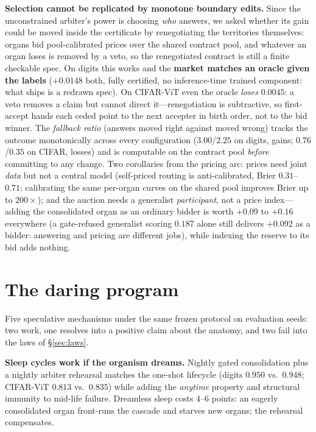 \documentclass{article}
\begin{document}
\textbf{Selection cannot be replicated by monotone boundary edits.} Since the
unconstrained arbiter's power is choosing \emph{who} answers, we asked whether
its gain could be moved inside the certificate by renegotiating the
territories themselves: organs bid pool-calibrated prices over the shared
contract pool, and whatever an organ loses is removed by a veto, so the
renegotiated contract is still a finite checkable spec. On digits this works
and the \textbf{market matches an oracle given the labels} ($+0.0148$ both,
fully certified, no inference-time trained component: what ships is a redrawn
spec). On CIFAR-ViT even the oracle \emph{loses} $0.0045$: a veto removes a
claim but cannot direct it---renegotiation is subtractive, so first-accept
hands each ceded point to the next accepter in birth order, not to the bid
winner. The \emph{fallback ratio} (answers moved right against moved wrong)
tracks the outcome monotonically across every configuration ($3.00$/$2.25$ on
digits, gains; $0.76$/$0.35$ on CIFAR, losses) and is computable on the
contract pool \emph{before} committing to any change. Two corollaries from the
pricing arc: prices need joint \emph{data} but not a central model
(self-priced routing is anti-calibrated, Brier $0.31$--$0.71$; calibrating the
same per-organ curves on the shared pool improves Brier up to $200\times$);
and the auction needs a generalist \emph{participant}, not a price
index---adding the consolidated organ as an ordinary bidder is worth $+0.09$
to $+0.16$ everywhere (a gate-refused generalist scoring $0.187$ alone still
delivers $+0.092$ as a bidder: answering and pricing are different jobs),
while indexing the reserve to its bid adds nothing.

\section{The daring program}\label{sec:daring}
Five speculative mechanisms under the same frozen protocol on evaluation
seeds: two work, one resolves into a positive claim about the anatomy, and
two fail into the laws of \S\ref{sec:laws}.

\textbf{Sleep cycles work if the organism dreams.} Nightly gated
consolidation plus a nightly arbiter rehearsal matches the one-shot lifecycle
(digits $0.950$ vs.\ $0.948$; CIFAR-ViT $0.813$ vs.\ $0.835$) while adding the
\emph{anytime} property and structural immunity to mid-life failure.
Dreamless sleep costs $4$--$6$ points: an eagerly consolidated organ
front-runs the cascade and starves new organs; the rehearsal compensates.
\end{document}
